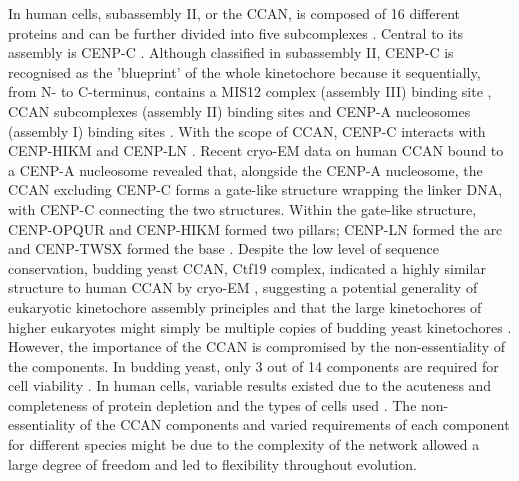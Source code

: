 In human cells, subassembly II, or the CCAN, is composed of 16 different proteins and can be further divided into five subcomplexes \citep{Foltz2006, Izuta2006ComprehensiveCells, Okada2006}. Central to its assembly is CENP-C \citep{Milks2009DissectionAssembly, Przewloka2011CENP-CAssembly}. Although classified in subassembly II, CENP-C is recognised as the 'blueprint' \citep{Walstein2021, Klare2015CENP-CKinetochores} of the whole kinetochore because it sequentially, from N- to C-terminus, contains a MIS12 complex (assembly III) binding site \citep{Screpanti2011DirectKinetochore, Gascoigne2011, Petrovic2016StructureKinetochores}, CCAN subcomplexes (assembly II) binding sites \citep{Klare2015CENP-CKinetochores, McKinley2015, Pentakota2017DecodingCENP-N, Nagpal2015} and CENP-A nucleosomes (assembly I) binding sites \citep{Carroll2010, Kato2013ACENP-C}. With the scope of CCAN, CENP-C interacts with CENP-HIKM and CENP-LN \citep{Klare2015CENP-CKinetochores, McKinley2015, Pentakota2017DecodingCENP-N, Nagpal2015}. Recent cryo-EM data on human CCAN bound to a CENP-A nucleosome revealed that, alongside the CENP-A nucleosome, the CCAN excluding CENP-C forms a gate-like structure wrapping the linker DNA, with CENP-C connecting the two structures. Within the gate-like structure, CENP-OPQUR and CENP-HIKM formed two pillars; CENP-LN formed the arc and CENP-TWSX formed the base \citep{Yatskevich2022StructureNucleosome, Pesenti2022StructureOrganization}. Despite the low level of sequence conservation, budding yeast CCAN, Ctf19 complex, indicated a highly similar structure to human CCAN by cryo-EM \citep{Yatskevich2022StructureNucleosome, Pesenti2022StructureOrganization, Hinshaw2019TheYeast, Yan2019StructureNucleosome}, suggesting a potential generality of eukaryotic kinetochore assembly principles and that the large kinetochores of higher eukaryotes might simply be multiple copies of budding yeast kinetochores \citep{Walstein2021, McAinsh2022TheKinetochores}. However, the importance of the CCAN is compromised by the non-essentiality of the components. In budding yeast, only 3 out of 14 components are required for cell viability \citep{DeWulf2003HierarchicalSubcomplexes, Fernius2009EstablishmentCsm3, Measday2002Ctf3pKinetochore, Ortiz1999AKinetochore, Pot2003Ch14pKinetochore}. In human cells, variable results existed due to the acuteness and completeness of protein depletion and the types of cells used \citep{Foltz2006, McKinley2015, Nguyen2021DifferentialPathways, Pesenti2018ReconstitutionNDC80, Raaijmakers2018BUB1Compromised}. The non-essentiality of the CCAN components and varied requirements of each component for different species might be due to the complexity of the network allowed a large degree of freedom and led to flexibility throughout evolution. 


